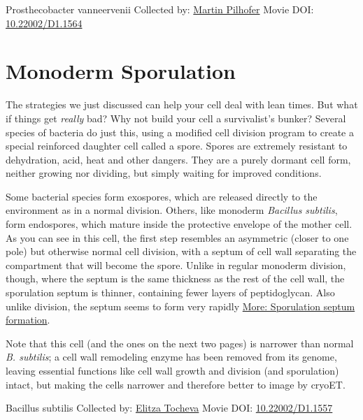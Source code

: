 \documentclass[]{tufte-book}
\begin{document}
\hypertarget{htmlwidget-d7bfb323fd42ad1bffd8}{}

\label{fig:8-4a}Prosthecobacter vanneervenii Collected by: \protect\hyperlink{martin_pilhofer}{Martin Pilhofer} Movie DOI: \href{https://doi.org/10.22002/D1.1564}{10.22002/D1.1564}

\hypertarget{monoderm-sporulation}{%
\section{Monoderm Sporulation}\label{monoderm-sporulation}}

The strategies we just discussed can help your cell deal with lean times. But what if things get \emph{really} bad? Why not build your cell a survivalist's bunker? Several species of bacteria do just this, using a modified cell division program to create a special reinforced daughter cell called a spore. Spores are extremely resistant to dehydration, acid, heat and other dangers. They are a purely dormant cell form, neither growing nor dividing, but simply waiting for improved conditions.

Some bacterial species form exospores, which are released directly to the environment as in a normal division. Others, like monoderm \emph{Bacillus subtilis}, form endospores, which mature inside the protective envelope of the mother cell. As you can see in this cell, the first step resembles an asymmetric (closer to one pole) but otherwise normal cell division, with a septum of cell wall separating the compartment that will become the spore. Unlike in regular monoderm division, though, where the septum is the same thickness as the rest of the cell wall, the sporulation septum is thinner, containing fewer layers of peptidoglycan. Also unlike division, the septum seems to form very rapidly \protect\hyperlink{Sporulation_septum_formation}{More: Sporulation septum formation}.

Note that this cell (and the ones on the next two pages) is narrower than normal \emph{B. subtilis}; a cell wall remodeling enzyme has been removed from its genome, leaving essential functions like cell wall growth and division (and sporulation) intact, but making the cells narrower and therefore better to image by cryoET.



\hypertarget{htmlwidget-73305df3e2cf152b7494}{}

\label{fig:8-5}Bacillus subtilis Collected by: \protect\hyperlink{elitza_tocheva}{Elitza Tocheva} Movie DOI: \href{https://doi.org/10.22002/D1.1557}{10.22002/D1.1557}
\end{document}
